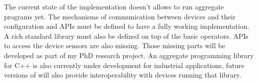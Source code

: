 The current state of the \Kotac{} implementation doesn't allows to run aggregate programs yet. The mechanisms of communication between devices and their configuration and APIs must be defined to have a fully working implementation. A rich standard library must also be defined on top of the basic operators. APIs to access the device sensors are also missing. Those missing parts will be developed as part of my PhD research project. An aggregate programming library for C++ is also currently under development for industrial applications, future versions of \Kotac{} will also provide interoperability with devices running that library.